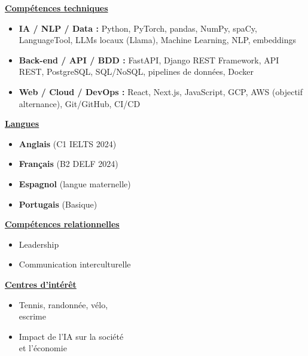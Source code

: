 \documentclass[letterpaper,10pt]{article}
\begin{document}
\noindent
\begin{minipage}[t]{0.39\textwidth}
  \raggedright
  \textbf{\underline{Comp\'etences techniques}}\\[-2pt]
  {\scriptsize
    \begin{itemize}[leftmargin=*,itemsep=1pt,parsep=0pt,topsep=0pt,partopsep=0pt]
      \item \textbf{IA / NLP / Data :} Python, PyTorch, pandas, NumPy, spaCy, LanguageTool, LLMs locaux (Llama), Machine Learning, NLP, embeddings
      \item \textbf{Back-end / API / BDD :} FastAPI, Django REST Framework, API REST, PostgreSQL, SQL/NoSQL, pipelines de donn\'ees, Docker
      \item \textbf{Web / Cloud / DevOps :} React, Next.js, JavaScript, GCP, AWS (objectif alternance), Git/GitHub, CI/CD
    \end{itemize}
  }
\end{minipage}\hfill
\begin{minipage}[t]{0.28\textwidth}
  \raggedright
  \textbf{\underline{Langues}}\\[-2pt]
  {\scriptsize
    \begin{itemize}[leftmargin=*,itemsep=0pt,parsep=0pt,topsep=0pt,partopsep=0pt]
      \item \textbf{Anglais} (C1 \textendash{} IELTS 2024)
      \item \textbf{Fran\c{c}ais} (B2 \textendash{} DELF 2024)
      \item \textbf{Espagnol} (langue maternelle)
      \item \textbf{Portugais} (Basique)
    \end{itemize}
  }

  \vspace{0.12cm}
  \textbf{\underline{Comp\'etences relationnelles}}\\[-2pt]
  {\scriptsize
    \begin{itemize}[leftmargin=*,itemsep=1pt,parsep=0pt,topsep=0pt,partopsep=0pt]
      \item Leadership
      \item Communication interculturelle
    \end{itemize}
  }
\end{minipage}\hfill
\begin{minipage}[t]{0.28\textwidth}
  \raggedright
  \textbf{\underline{Centres d'int\'er\^et}}\\[-2pt]
  {\scriptsize
    \begin{itemize}[leftmargin=*,itemsep=1pt,parsep=0pt,topsep=0pt,partopsep=0pt]
      \item Tennis, randonn\'ee, v\'elo, \\escrime
      \item Impact de l'IA sur la soci\'et\'e \\et l'\'economie
    \end{itemize}
  }
\end{minipage}



\end{document}
